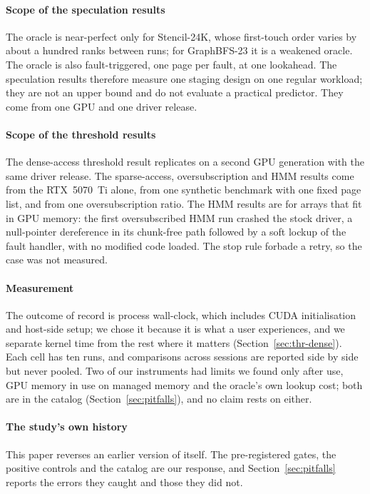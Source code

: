 \paragraph{Scope of the speculation results}
The oracle is near-perfect only for Stencil-24K, whose first-touch order varies
by about a hundred ranks between runs; for GraphBFS-23 it is a weakened oracle.
The oracle is also fault-triggered, one page per fault, at one lookahead. The
speculation results therefore measure one staging design on one regular
workload; they are not an upper bound and do not evaluate a practical
predictor. They come from
one GPU and one driver release.

\paragraph{Scope of the threshold results}
The dense-access threshold result replicates on a second GPU generation with
the same driver release. The sparse-access, oversubscription and HMM results
come from the RTX~5070~Ti alone, from one synthetic benchmark with one fixed
page list, and from one oversubscription ratio. The HMM results are for arrays
that fit in GPU memory: the first oversubscribed HMM run crashed the stock
driver, a null-pointer dereference in its chunk-free path followed by a soft
lockup of the fault handler, with no modified code loaded. The stop rule
forbade a retry, so the case was not measured.

\paragraph{Measurement}
The outcome of record is process wall-clock, which includes CUDA
initialisation and host-side setup; we chose it because it is what a user
experiences, and we separate kernel time from the rest where it matters
(Section~\ref{sec:thr-dense}). Each cell has ten runs, and comparisons across
sessions are reported side by side but never pooled. Two of our instruments
had limits we found only after use, GPU memory in use on managed memory and
the oracle's own lookup cost; both are in the catalog
(Section~\ref{sec:pitfalls}), and no claim rests on either.

\paragraph{The study's own history}
This paper reverses an earlier version of itself. The pre-registered gates,
the positive controls and the catalog are our response, and
Section~\ref{sec:pitfalls} reports the errors they caught and those they did
not.

